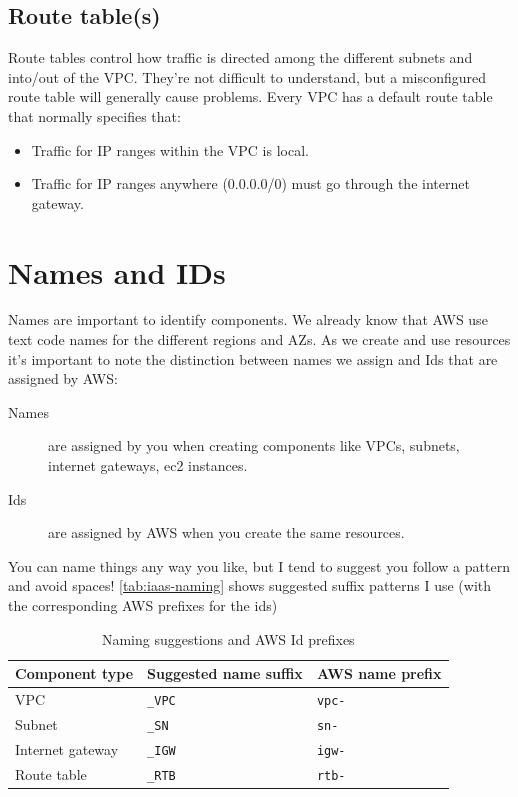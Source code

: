 \documentclass{pgnotes}
\begin{document}
\subsection{Route table(s)}

Route tables control how traffic is directed among the different subnets and into/out of the VPC.
They're not difficult to understand, but a misconfigured route table will generally cause problems.
Every VPC has a default route table that normally specifies that:
\begin{itemize}
\item Traffic for IP ranges within the VPC is local.
\item Traffic for IP ranges anywhere (0.0.0.0/0) must go through the internet gateway.
\end{itemize}


\section{Names and IDs}\label{names-and-ids}

Names are important to identify components.
We already know that AWS use text code names for the different regions and AZs.
As we create and use resources it's important to note the distinction between names we assign and Ids that are assigned by AWS:

\begin{description}
\item[Names]
  are assigned by you when creating components like VPCs, subnets, internet gateways, ec2 instances.
\item[Ids]
  are assigned by AWS when you create the same resources.
\end{description}

You can name things any way you like, but I tend to suggest you follow a pattern and avoid spaces!
\autoref{tab:iaas-naming} shows suggested suffix patterns I use (with the corresponding AWS prefixes for the ids)

\begin{table}[htbp]
  \centering
  \begin{tabular}{l l l}
    \toprule
    \textbf{Component type} & \textbf{Suggested name suffix} & \textbf{AWS name prefix}\\
    \midrule
    VPC & \texttt{\_VPC} & \texttt{vpc-}\\
    Subnet & \texttt{\_SN} & \texttt{sn-}\\
    Internet gateway & \texttt{\_IGW} & \texttt{igw-}\\
    Route table & \texttt{\_RTB} & \texttt{rtb-}\\
    \bottomrule
  \end{tabular}
  \caption{Naming suggestions and AWS Id prefixes}
  \label{tab:iaas-naming}
\end{table}
\end{document}
